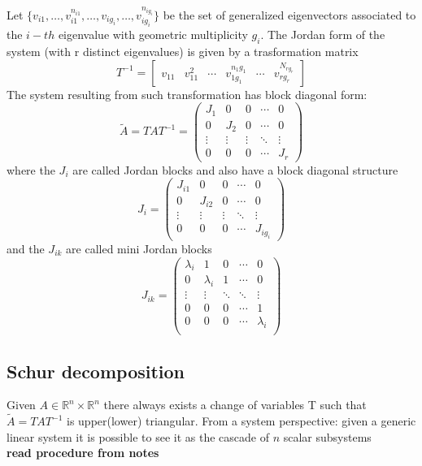 \documentclass{book}
\newcommand{\R}{\mathbb{R}}
\theoremstyle{definition}
\theoremstyle{remark}
\theoremstyle{remark}
\begin{document}
Let $\{v_{i1},\dots,v_{i1}^{n_{i1}},\dots,v_{ig_i},\dots,v_{ig_i}^{n_{ig_i}}\}$ be the set of generalized eigenvectors associated to the $i-th$ eigenvalue with geometric multiplicity $g_i$. The Jordan form of the system (with r distinct eigenvalues) is given by a trasformation matrix
\[
T^{-1}=\begin{bmatrix}
    v_{11} & v_{11}^2 & \cdots & v_{1g_1}^{n_1{g_1}} & \cdots & v_{rg_r}^{N_{rg_r}}
    \end{bmatrix}
\]
The system resulting from such transformation has block diagonal form:
\[
\tilde{A} = TAT^{-1} = \begin{pmatrix}
    J_1 & 0 & 0 & \cdots & 0\\
    0 & J_2 & 0 & \cdots & 0\\
    \vdots & \vdots & \vdots &\ddots & \vdots\\
    0 & 0 & 0 & \cdots & J_r
\end{pmatrix}
\]
where the $J_i$ are called Jordan blocks and also have a block diagonal structure
\[
J_i = \begin{pmatrix}
    J_{i1} & 0 & 0 & \cdots & 0\\
    0 & J_{i2} & 0 & \cdots & 0\\
    \vdots & \vdots & \vdots &\ddots & \vdots\\
    0 & 0 & 0 & \cdots & J_{ig_i}
\end{pmatrix}
\]
and the $J_{ik}$ are called mini Jordan blocks
\[
J_{ik} = \begin{pmatrix}
    \lambda_i & 1 & 0 & \cdots & 0\\
    0 & \lambda_i & 1 & \cdots & 0\\
    \vdots & \vdots & \ddots &\ddots & \vdots\\
    0 & 0 & 0 & \cdots & 1\\
    0 & 0 & 0 & \cdots & \lambda_i\\
\end{pmatrix}
\]



\subsection{Schur decomposition}
Given $A \in \R^n \times \R^n$ there always exists a change of variables T such that $\tilde{A}=TAT^{-1}$ is upper(lower) triangular. From a system perspective: given a generic linear system it is possible to see it as the cascade of $n$ scalar subsystems\\
\textbf{read procedure from notes}
\end{document}
